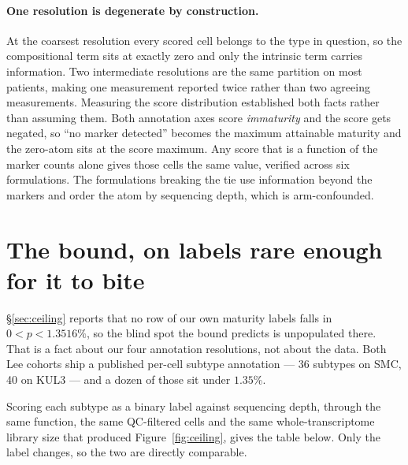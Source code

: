 \paragraph{One resolution is degenerate by construction.} At the coarsest
resolution every scored cell belongs to the type in question, so the
compositional term sits at exactly zero and only the intrinsic term carries
information. Two intermediate resolutions are the same partition on most
patients, making one measurement reported twice rather than two agreeing
measurements. Measuring the score distribution established both facts rather
than assuming them. Both annotation axes score \emph{immaturity} and the score
gets negated, so ``no marker detected'' becomes the maximum attainable maturity
and the zero-atom sits at the score maximum. Any score that is a function of
the marker counts alone gives those cells the same value, verified across six
formulations. The formulations breaking the tie use information beyond the
markers and order the atom by sequencing depth, which is arm-confounded.

\section{The bound, on labels rare enough for it to bite}
\label{app:rare}

\S\ref{sec:ceiling} reports that no row of our own maturity labels falls in
$0 < p < 1.3516\%$, so the blind spot the bound predicts is unpopulated there.
That is a fact about our four annotation resolutions, not about the data. Both
Lee cohorts ship a published per-cell subtype annotation --- 36 subtypes on SMC,
40 on KUL3 --- and a dozen of those sit under $1.35\%$.

Scoring each subtype as a binary label against sequencing depth, through the
same function, the same QC-filtered cells and the same whole-transcriptome
library size that produced Figure~\ref{fig:ceiling}, gives the table below. Only
the label changes, so the two are directly comparable.

